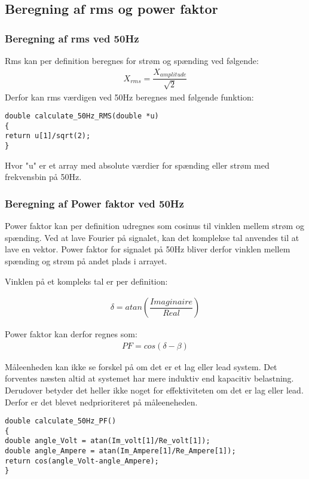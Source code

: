 \subsection{Beregning af rms og power faktor}

\subsubsection{Beregning af rms ved 50Hz}
Rms kan per definition beregnes for strøm og spænding ved følgende: 
\begin{align}
 X_{rms}= \dfrac{X_{amplitude}}{\sqrt{2}}
\end{align}
Derfor kan rms værdigen ved 50Hz beregnes med følgende funktion:
\begin{lstlisting}
double calculate_50Hz_RMS(double *u)
{
return u[1]/sqrt(2);  
}
\end{lstlisting}

Hvor "u" er et array med absolute værdier for spænding eller strøm med frekvensbin på 50Hz.

\subsubsection{Beregning af Power faktor ved 50Hz}

Power faktor kan per definition udregnes som cosinus til vinklen mellem strøm og spænding. Ved at lave Fourier på signalet, kan det komplekse tal anvendes til at lave en vektor. Power faktor for signalet på 50Hz bliver derfor vinklen mellem spænding og strøm på andet plads i arrayet.

Vinklen på et kompleks tal er per definition:

\begin{align}
\delta = atan(\dfrac{Imaginaire}{Real})
\end{align}

Power faktor kan derfor regnes som:
\begin{align}
PF = cos(\delta - \beta)
\end{align}

Måleenheden kan ikke se forskel på om det er et lag eller lead system. Det forventes næsten altid at systemet har mere induktiv end kapacitiv belastning. Derudover betyder det heller ikke noget for effektiviteten om det er lag eller lead. Derfor er det blevet nedprioriteret på måleeneheden.

\begin{lstlisting}
double calculate_50Hz_PF()
{
double angle_Volt = atan(Im_volt[1]/Re_volt[1]);
double angle_Ampere = atan(Im_Ampere[1]/Re_Ampere[1]);    
return cos(angle_Volt-angle_Ampere);
}
\end{lstlisting}
 
    

  
